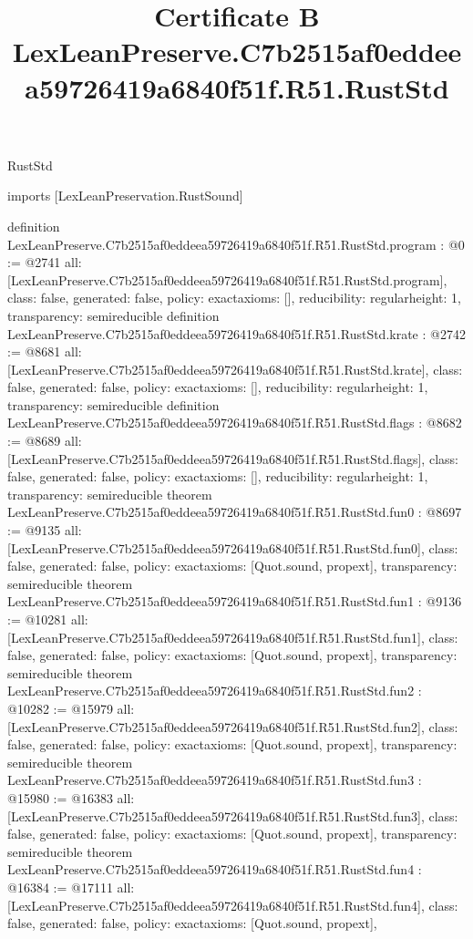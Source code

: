 \begin{lexlean}{RustStd}
\title{Certificate B LexLeanPreserve.C7b2515af0eddeea59726419a6840f51f.R51.RustStd}
\begin{coremodule}
imports [LexLeanPreservation.RustSound]

definition LexLeanPreserve.C7b2515af0eddeea59726419a6840f51f.R51.RustStd.program : @0 := @2741 {
  all: [LexLeanPreserve.C7b2515af0eddeea59726419a6840f51f.R51.RustStd.program],
  class: false,
  generated: false,
  policy: exact{axioms: []},
  reducibility: regular{height: 1},
  transparency: semireducible
}
definition LexLeanPreserve.C7b2515af0eddeea59726419a6840f51f.R51.RustStd.krate : @2742 := @8681 {
  all: [LexLeanPreserve.C7b2515af0eddeea59726419a6840f51f.R51.RustStd.krate],
  class: false,
  generated: false,
  policy: exact{axioms: []},
  reducibility: regular{height: 1},
  transparency: semireducible
}
definition LexLeanPreserve.C7b2515af0eddeea59726419a6840f51f.R51.RustStd.flags : @8682 := @8689 {
  all: [LexLeanPreserve.C7b2515af0eddeea59726419a6840f51f.R51.RustStd.flags],
  class: false,
  generated: false,
  policy: exact{axioms: []},
  reducibility: regular{height: 1},
  transparency: semireducible
}
theorem LexLeanPreserve.C7b2515af0eddeea59726419a6840f51f.R51.RustStd.fun0 : @8697 := @9135 {
  all: [LexLeanPreserve.C7b2515af0eddeea59726419a6840f51f.R51.RustStd.fun0],
  class: false,
  generated: false,
  policy: exact{axioms: [Quot.sound, propext]},
  transparency: semireducible
}
theorem LexLeanPreserve.C7b2515af0eddeea59726419a6840f51f.R51.RustStd.fun1 : @9136 := @10281 {
  all: [LexLeanPreserve.C7b2515af0eddeea59726419a6840f51f.R51.RustStd.fun1],
  class: false,
  generated: false,
  policy: exact{axioms: [Quot.sound, propext]},
  transparency: semireducible
}
theorem LexLeanPreserve.C7b2515af0eddeea59726419a6840f51f.R51.RustStd.fun2 : @10282 := @15979 {
  all: [LexLeanPreserve.C7b2515af0eddeea59726419a6840f51f.R51.RustStd.fun2],
  class: false,
  generated: false,
  policy: exact{axioms: [Quot.sound, propext]},
  transparency: semireducible
}
theorem LexLeanPreserve.C7b2515af0eddeea59726419a6840f51f.R51.RustStd.fun3 : @15980 := @16383 {
  all: [LexLeanPreserve.C7b2515af0eddeea59726419a6840f51f.R51.RustStd.fun3],
  class: false,
  generated: false,
  policy: exact{axioms: [Quot.sound, propext]},
  transparency: semireducible
}
theorem LexLeanPreserve.C7b2515af0eddeea59726419a6840f51f.R51.RustStd.fun4 : @16384 := @17111 {
  all: [LexLeanPreserve.C7b2515af0eddeea59726419a6840f51f.R51.RustStd.fun4],
  class: false,
  generated: false,
  policy: exact{axioms: [Quot.sound, propext]},
}
\end{coremodule}
\end{lexlean}

